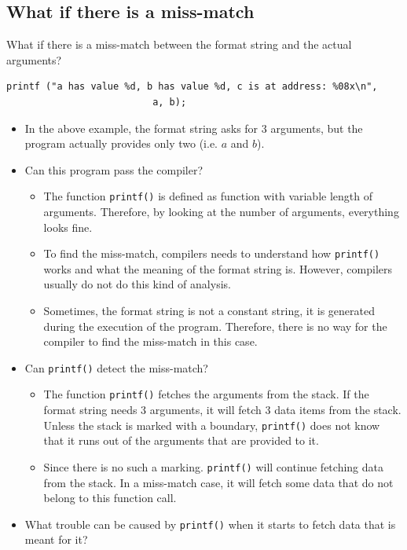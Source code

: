 \subsection{What if there is a miss-match}

What if there is a miss-match between the format string and the actual
      arguments?
\begin{Verbatim}[frame=single]
printf ("a has value %d, b has value %d, c is at address: %08x\n", 
                          a, b);
\end{Verbatim}

   \begin{itemize}
   \item In the above example, the format string asks for 3 arguments, but the
         program actually provides only two (i.e. $a$ and $b$).
   \item Can this program pass the compiler?
       \begin{itemize}
       \item The function {\tt printf()} is defined as function with variable
             length of arguments. Therefore, by looking at the number of
             arguments, everything looks fine.
       \item To find the miss-match, compilers needs to understand how
             {\tt printf()} works and what the meaning of the format string
             is. However, compilers usually do not do this kind of analysis.
       \item Sometimes, the format string is not a constant string, it is
             generated during the execution of the program. Therefore, there
             is no way for the compiler to find the miss-match in this case.
       \end{itemize}
   \item Can {\tt printf()} detect the miss-match?
       \begin{itemize}
       \item The function {\tt printf()} fetches the arguments from the stack.
             If the format string needs 3 arguments, it will fetch 3 data items
             from the stack.
             Unless the stack is marked with a boundary, {\tt printf()} does not
             know that it runs out of the arguments that are provided to it.
       \item Since there is no such a marking. {\tt printf()} will continue
             fetching data from the stack. In a miss-match case, it will
             fetch some data that do not belong to this function call.
       \end{itemize}

   \item What trouble can be caused by {\tt printf()} when it starts to
         fetch data that is meant for it?

   \end{itemize}



